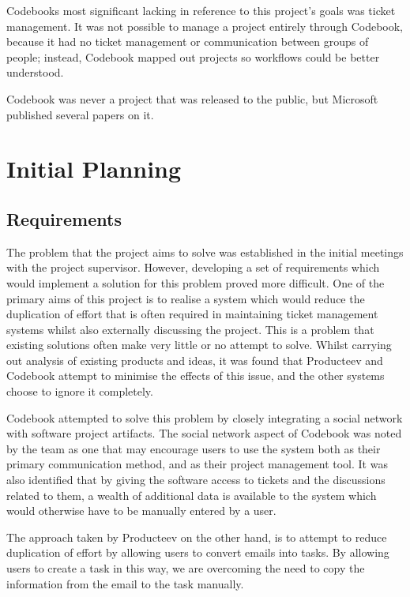 \documentclass[a4paper]{l3proj}
\begin{document}
Codebooks most significant lacking in reference to this project’s goals was ticket management. It was not possible to manage a project entirely through Codebook, because it had no ticket management or communication between groups of people; instead, Codebook mapped out projects so workflows could be better understood.

Codebook was never a project that was released to the public, but Microsoft published several papers on it.


\chapter{Initial Planning}
\label{initialPlanning}

\section{Requirements}
\label{requirements}

The problem that the project aims to solve was established in the initial meetings with the project supervisor. However, developing a set of requirements which would implement a solution for this problem proved more difficult. One of the primary aims of this project is to realise a system which would reduce the duplication of effort that is often required in maintaining ticket management systems whilst also externally discussing the project. This is a problem that existing solutions often make very little or no attempt to solve. Whilst carrying out analysis of existing products and ideas, it was found that Producteev and Codebook attempt to minimise the effects of this issue, and the other systems choose to ignore it completely.

Codebook attempted to solve this problem by closely integrating a social network with software project artifacts. The social network aspect of Codebook was noted by the team as one that may encourage users to use the system both as their primary communication method, and as their project management tool. It was also identified that by giving the software access to tickets and the discussions related to them, a wealth of additional data is available to the system which would otherwise have to be manually entered by a user.

The approach taken by Producteev on the other hand, is to attempt to reduce duplication of effort by allowing users to convert emails into tasks. By allowing users to create a task in this way, we are overcoming the need to copy the information from the email to the task manually.
\end{document}
